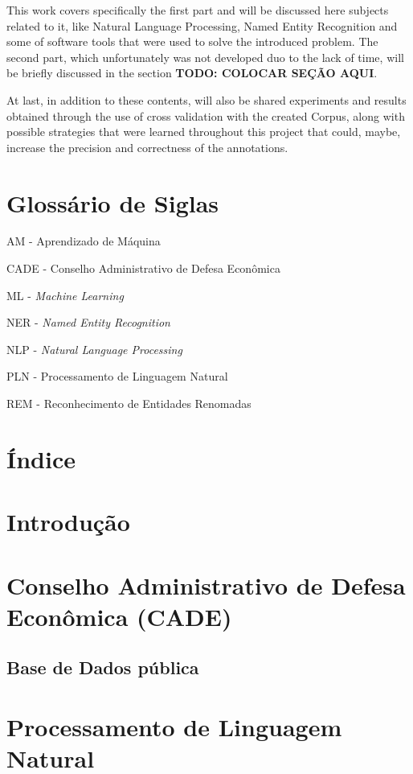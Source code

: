 \documentclass[11pt]{article}
\begin{document}
This work covers specifically the first part and will be discussed here subjects related to it, like Natural Language Processing, Named Entity Recognition and some of software tools that
were used to solve the introduced problem. The second part, which unfortunately was not developed duo to the lack of time, will be briefly discussed in the section \textbf{TODO: COLOCAR SEÇÃO AQUI}.

At last, in addition to these contents, will also be shared experiments and results obtained through the use of cross validation with the created Corpus, along with possible strategies that
were learned throughout this project that could, maybe, increase the precision and correctness of the annotations.

\pagebreak
\thispagestyle{empty}
\section*{Glossário de Siglas}
\noindent AM - Aprendizado de Máquina

\noindent CADE - Conselho Administrativo de Defesa Econômica

\noindent ML - \textit{Machine Learning}

\noindent NER - \textit{Named Entity Recognition}

\noindent NLP - \textit{Natural Language Processing}

\noindent PLN - Processamento de Linguagem Natural

\noindent REM - Reconhecimento de Entidades Renomadas


\pagebreak
\thispagestyle{empty}
\section*{Índice}

\pagebreak
\section{Introdução}

\pagebreak
\section{Conselho Administrativo de Defesa Econômica (CADE)}
\subsection{Base de Dados pública}

\pagebreak
\section{Processamento de Linguagem Natural}
\end{document}
